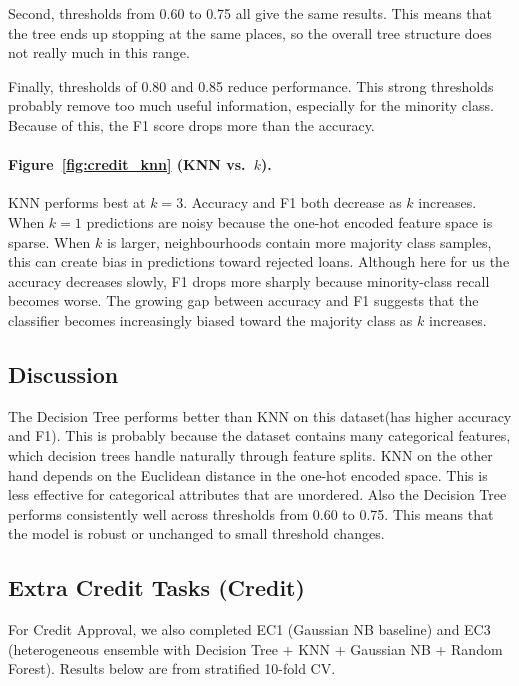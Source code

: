 \documentclass[11pt,letterpaper]{article}
\begin{document}
Second, thresholds from 0.60 to 0.75 all give the same results. This means that
the tree ends up stopping at the same places, so the overall tree structure
does not really much in this range.

Finally, thresholds of 0.80 and 0.85 reduce performance. This strong thresholds probably remove too much useful information, especially for the minority class. Because of this, the F1 score drops more than the accuracy.

\paragraph{Figure~\ref{fig:credit_knn} (KNN vs.\ $k$).}
KNN performs best at $k=3$. Accuracy and F1 both decrease as $k$ increases. When $k=1$ predictions are noisy because the one-hot encoded feature
space is sparse. When $k$ is larger, neighbourhoods contain more majority class samples, this can create bias in predictions toward rejected loans.
Although here for us the accuracy decreases slowly,  F1 drops more sharply because minority-class
recall becomes worse. The growing gap between accuracy and F1 suggests that
the classifier becomes increasingly biased toward the majority class as $k$
increases.

\subsection{Discussion}

The Decision Tree performs better than KNN on this dataset(has higher accuracy and F1). This is probably because the dataset contains many
categorical features, which decision trees handle naturally through feature
splits. KNN on the other hand depends on the Euclidean distance in the one-hot encoded
space. This is less effective for categorical attributes that are unordered. Also the Decision Tree performs consistently well across
thresholds from 0.60 to 0.75. This means that the model is robust or unchanged to small threshold changes.

\subsection{Extra Credit Tasks (Credit)}

For Credit Approval, we also completed EC1 (Gaussian NB baseline) and EC3
(heterogeneous ensemble with Decision Tree + KNN + Gaussian NB + Random
Forest). Results below are from stratified 10-fold CV.
\end{document}
